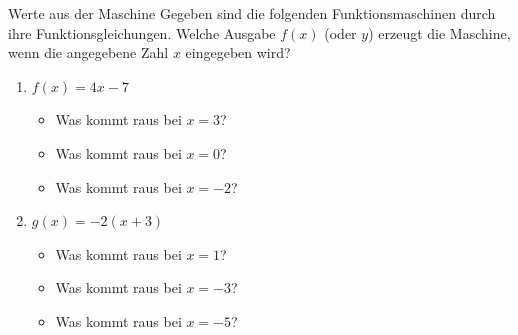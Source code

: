 \begin{aufgabenumgebung}{Werte aus der Maschine}{}
Gegeben sind die folgenden Funktionsmaschinen durch ihre Funktionsgleichungen. Welche Ausgabe $f(x)$ (oder $y$) erzeugt die Maschine, wenn die angegebene Zahl $x$ eingegeben wird?
\begin{enumerate}
    \item $f(x) = 4x - 7$
    \begin{itemize}
        \item Was kommt raus bei $x=3$?
        \item Was kommt raus bei $x=0$?
        \item Was kommt raus bei $x=-2$?
    \end{itemize}
    \item $g(x) = -2(x+3)$
    \begin{itemize}
        \item Was kommt raus bei $x=1$?
        \item Was kommt raus bei $x=-3$?
        \item Was kommt raus bei $x=-5$?
    \end{itemize}
\end{enumerate}
\end{aufgabenumgebung}


